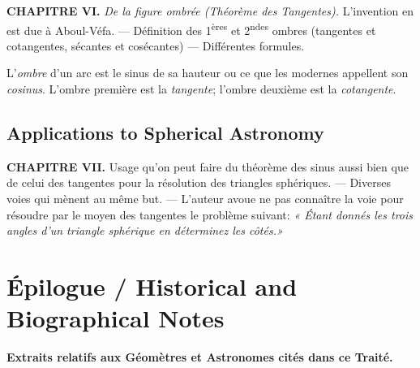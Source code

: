 \documentclass[11pt,a4paper]{article}
\theoremstyle{plain}
\theoremstyle{definition}
\theoremstyle{remark}
\begin{document}
\textbf{CHAPITRE VI.} \textit{De la figure ombrée (Théorème des Tangentes).} L'invention en est due à Aboul-Véfa. --- Définition des 1\textsuperscript{ères} et 2\textsuperscript{ndes} ombres (tangentes et cotangentes, sécantes et cosécantes) --- Différentes formules.

L'\textit{ombre} d'un arc est le sinus de sa hauteur ou ce que les modernes appellent son \textit{cosinus}. L'ombre première est la \textit{tangente}; l'ombre deuxième est la \textit{cotangente}.


\subsection{Applications to Spherical Astronomy}
\label{sec:applications}


\textbf{CHAPITRE VII.} Usage qu'on peut faire du théorème des sinus aussi bien que de celui des tangentes pour la résolution des triangles sphériques. --- Diverses voies qui mènent au même but. --- L'auteur avoue ne pas connaître la voie pour résoudre par le moyen des tangentes le problème suivant: \textit{« Étant donnés les trois angles d'un triangle sphérique en déterminez les côtés.»}


\clearpage

\section*{Épilogue / Historical and Biographical Notes}


\textbf{Extraits relatifs aux Géomètres et Astronomes cités dans ce Traité.}
\end{document}
